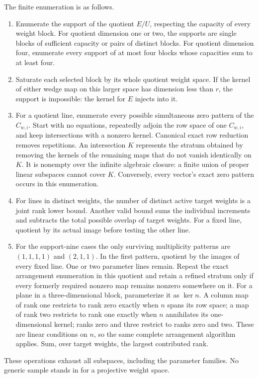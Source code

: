 The finite enumeration is as follows.
\begin{enumerate}
\item Enumerate the support of the quotient $E/U$, respecting the capacity
of every weight block.  For quotient dimension one or two, the supports
are single blocks of sufficient capacity or pairs of distinct blocks.
For quotient dimension four, enumerate every support of at most four blocks
whose capacities sum to at least four.
\item Saturate each selected block by its whole quotient weight space.
If the kernel of either wedge map on this larger space has dimension
less than $r$, the support is impossible: the kernel for $E$ injects into it.
\item For a quotient line, enumerate every possible simultaneous zero
pattern of the $C_{w,i}$.  Start with no equations, repeatedly adjoin the
row space of one $C_{w,i}$, and keep intersections with a nonzero kernel.
Canonical exact row reduction removes repetitions.  An intersection $K$
represents the stratum obtained by removing the kernels of the remaining
maps that do not vanish identically on $K$.  It is nonempty over the infinite
algebraic closure: a finite union of proper linear subspaces cannot cover
$K$.  Conversely, every vector's exact zero pattern occurs in this enumeration.
\item For lines in distinct weights, the number of distinct active target
weights is a joint rank lower bound.  Another valid bound sums the individual
increments and subtracts the total possible overlap of target weights.
For a fixed line, quotient by its actual image before testing the other line.
\item For the support-nine cases the only surviving multiplicity patterns
are $(1,1,1,1)$ and $(2,1,1)$.  In the first pattern, quotient by the images
of every fixed line.  One or two parameter lines remain.  Repeat the exact
arrangement enumeration in this quotient and retain a refined stratum only
if every formerly required nonzero map remains nonzero somewhere on it.
For a plane in a three-dimensional block, parameterize it as $\ker n$.
A column map of rank one restricts to rank zero exactly when $n$ spans its
row space; a map of rank two restricts to rank one exactly when $n$ annihilates
its one-dimensional kernel; ranks zero and three restrict to ranks zero and
two.  These are linear conditions on $n$, so the same complete arrangement
algorithm applies.  Sum, over target weights, the largest contributed rank.
\end{enumerate}
These operations exhaust all subspaces, including the parameter families.
No generic sample stands in for a projective weight space.

